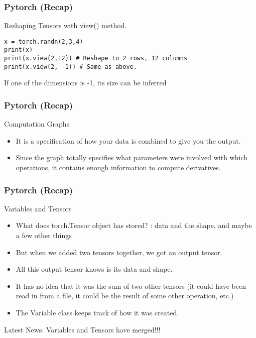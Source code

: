 \begin{frame}[fragile]
\frametitle{Pytorch (Recap)}
Reshaping Tensors with view() method.
 \begin{lstlisting}
x = torch.randn(2,3,4)
print(x)
print(x.view(2,12)) # Reshape to 2 rows, 12 columns
print(x.view(2, -1)) # Same as above. 
 \end{lstlisting}
  If one of the dimensions is -1, its size can be inferred
 \end{frame} 
 
\begin{frame}[fragile]
\frametitle{Pytorch (Recap)}
Computation Graphs
\begin{itemize}
\item It is a specification of how your data is combined to give you the output. 
\item Since the graph totally specifies what parameters were involved with which operations, it contains enough information to compute derivatives.
\end{itemize}
 \end{frame} 
 
 
\begin{frame}[fragile]
\frametitle{Pytorch (Recap)}
Variables and Tensors
\begin{itemize}
\item What does torch.Tensor object has stored? : data and the shape, and maybe a few other things
\item But when we added two tensors together, we got an output tensor. 
\item All this output tensor knows is its data and shape. 
\item It has no idea that it was the sum of two other tensors (it could have been read in from a file, it could be the result of some other operation, etc.)
\item The Variable class keeps track of how it was created. 
\end{itemize}
Latest News: Variables and Tensors have merged!!!
 \end{frame} 
 
